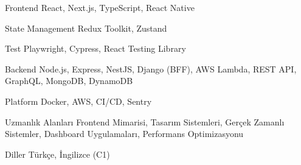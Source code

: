 \begin{cvskills}

\cvskill
{Frontend}
{React, Next.js, TypeScript, React Native}

\cvskill
{State Management}
{Redux Toolkit, Zustand}

\cvskill
{Test}
{Playwright, Cypress, React Testing Library}

\cvskill
{Backend}
{Node.js, Express, NestJS, Django (BFF), AWS Lambda, REST API, GraphQL, MongoDB, DynamoDB}

\cvskill
{Platform}
{Docker, AWS, CI/CD, Sentry}

\cvskill
{Uzmanlık Alanları}
{Frontend Mimarisi, Tasarım Sistemleri, Gerçek Zamanlı Sistemler, Dashboard Uygulamaları, Performans Optimizasyonu}

\cvskill
{Diller}
{Türkçe, İngilizce (C1)}

\end{cvskills}
